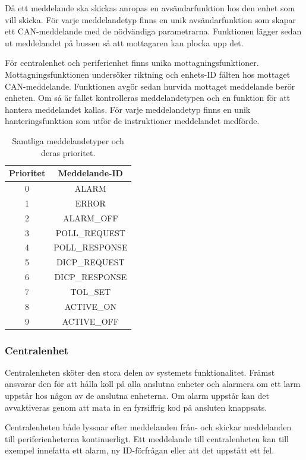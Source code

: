 \documentclass[a4paper]{article}
\begin{document}
Då ett meddelande ska skickas anropas en avsändarfunktion hos den enhet som vill skicka.
För varje meddelandetyp finns en unik avsändarfunktion som skapar ett CAN-meddelande med de nödvändiga parametrarna.
Funktionen lägger sedan ut meddelandet på bussen så att mottagaren kan plocka upp det.

För centralenhet och periferienhet finns unika mottagningsfunktioner.
Mottagningsfunktionen undersöker riktning och enhets-ID fälten hos mottaget CAN-meddelande.
Funktionen avgör sedan hurvida mottaget meddelande berör enheten.
Om så är fallet kontrolleras meddelandetypen och en funktion för att hantera meddelandet kallas.
För varje meddelandetyp finns en unik hanteringsfunktion som utför de instruktioner meddelandet medförde.

\begin{table}[H]
  \centering
  \begin{tabular}{|c|c|}\hline
    Prioritet & Meddelande-ID \\\hline
    0 & ALARM \\\hline
    1 & ERROR \\\hline
	2 & ALARM\_OFF \\\hline
	3 & POLL\_REQUEST \\\hline
	4 & POLL\_RESPONSE \\\hline
    5 & DICP\_REQUEST \\\hline
    6 & DICP\_RESPONSE \\\hline
    7 & TOL\_SET \\\hline
    8 & ACTIVE\_ON \\\hline
    9 & ACTIVE\_OFF \\\hline
  \end{tabular}
  \caption{Samtliga meddelandetyper och deras prioritet.}
  \label{tab:meddelandetyper}
\end{table}

\subsubsection{Centralenhet}
Centralenheten sköter den stora delen av systemets funktionalitet.
Främst ansvarar den för att hålla koll på alla anslutna enheter och alarmera om ett larm uppstår hos någon av de anslutna enheterna.
Om alarm uppstår kan det avvaktiveras genom att mata in en fyrsiffrig kod på ansluten knappsats.

Centralenheten både lyssnar efter meddelanden från- och skickar meddelanden till periferienheterna kontinuerligt.
Ett meddelande till centralenheten kan till exempel innefatta ett alarm, ny ID-förfrågan eller att det uppstått ett fel.
\end{document}
